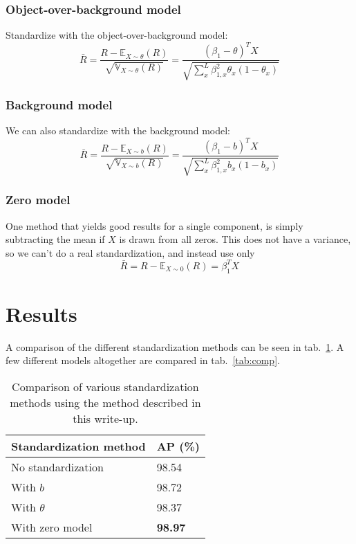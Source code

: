 \documentclass{article}
\begin{document}
\subsubsection{Object-over-background model}
Standardize with the object-over-background model:
\[
    \bar R = \frac{R - \mathbb{E}_{X \sim \theta}(R)}{\sqrt{\mathbb{V}_{X \sim \theta}(R)}} = \frac{(\beta_1 - \theta)^T X}{\sqrt{\sum_x^L \beta_{1,x}^2 \theta_x (1 - \theta_x)}}
\]
\subsubsection{Background model}
We can also standardize with the background model:
\[
    \bar R = \frac{R - \mathbb{E}_{X \sim b}(R)}{\sqrt{\mathbb{V}_{X \sim b}(R)}} = \frac{(\beta_1 - b)^T X}{\sqrt{\sum_x^L \beta_{1,x}^2 b_x (1 - b_x)}}
\]
\subsubsection{Zero model}
One method that yields good results for a single component, is simply subtracting the mean if $X$ is drawn from all zeros. This does not have a variance, so we can't do a real standardization, and instead use only 
\[
    \bar R = R - \mathbb{E}_{X \sim 0}(R) = \beta_1^T X
\]


\section{Results}
A comparison of the different standardization methods can be seen in tab.~\ref{tab:standardization}. A few different models altogether are compared in tab.~\ref{tab:comp}.

\begin{table}
    \centering
    \begin{tabular}{|l|l|}
        \hline
        Standardization method & AP (\%) \\
        \hline 
        No standardization &               98.54 \\
        With $b$     &   98.72 \\
        With $\theta$ &       98.37 \\
        With zero model & \textbf{98.97} \\
        \hline
    \end{tabular}
    \caption{Comparison of various standardization methods using the method described in this write-up.} \label{tab:standardization}
\end{table}
\end{document}
